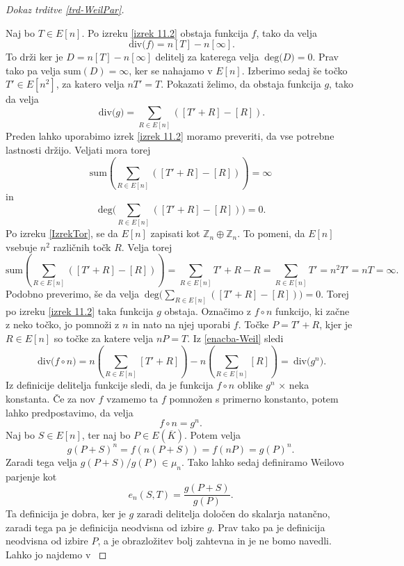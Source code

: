 \documentclass[12pt,a4paper,twoside]{article}
\theoremstyle{definition} %
\theoremstyle{plain} %
\numberwithin{equation}{section}  %
\newcommand{\E}[1]{E({#1})}
\newcommand{\DEG}[1]{\ \text{deg(}{#1}\text{)}}
\newcommand{\Div}[1]{\ \text{div(}{#1}\text{)}}
\begin{document}
\begin{proof}[Dokaz trditve \ref{trd-WeilPar}]~

Naj bo $T \in E[n]$.
Po izreku \ref{izrek 11.2} obstaja funkcija $f$, tako da velja
\begin{equation}
\label{enacba-Weil}
\Div{f} = n[T]-n[\infty].
\end{equation}
To drži ker je $D = n[T]-n[\infty]$ delitelj za katerega velja $\DEG{D} = 0$. Prav tako pa velja $\text{sum}(D) = \infty$, ker se nahajamo v $E[n]$.
Izberimo sedaj še točko $T' \in E[n^2]$, za katero velja $nT' = T$. Pokazati želimo, da obstaja funkcija $g$, tako da velja
$$\Div{g} = \sum_{R \in E[n]}([T' + R]- [R]).$$
Preden lahko uporabimo izrek \ref{izrek 11.2} moramo preveriti, da vse potrebne lastnosti držijo. Veljati mora torej 
$$\text{sum}( \sum_{R \in E[n]}([T' + R]- [R])) = \infty$$
 in
 $$\DEG{ \sum_{R \in E[n]}([T' + R]- [R])} = 0.$$
Po izreku \ref{IzrekTor}, se da $E[n]$ zapisati kot $\mathbb{Z}_n \oplus \mathbb{Z}_n$. To pomeni, da $E[n]$ vsebuje $n^2$ različnih točk $R$. Velja torej
$$\text{sum}(\sum_{R \in E[n]}([T' + R]- [R])) = \sum_{R \in E[n]} T' +R-R = \sum_{R \in E[n]} T' = n^2T' = nT = \infty.$$
Podobno preverimo, še da velja $\DEG{\sum_{R \in E[n]}([T' + R]- [R])} = 0.$ Torej po izreku \ref{izrek 11.2} taka funkcija $g$ obstaja.
Označimo z $f \circ n$ funkcijo, ki začne z neko točko, jo pomnoži z $n$ in nato na njej uporabi $f$. Točke $P = T' + R$, kjer je $R\in E[n]$ so točke za katere velja $nP=T$. Iz \ref{enacba-Weil}
sledi
$$\Div{f \circ n} = n(\sum_{R \in E[n]}[T' + R]) - n(\sum_{R \in E[n]}[R]) = \Div{g^n}.$$
Iz definicije delitelja funkcije sledi, da je funkcija $f \circ n$ oblike $g^n$ $\times$ neka konstanta. Če za nov $f$ vzamemo ta $f$ pomnožen s primerno konstanto, potem lahko predpostavimo, da velja
$$f \circ n = g^n.$$
Naj bo $S \in E[n]$, ter naj bo $P \in \E{\overline{K}}$. Potem velja
$$g(P+S)^n = f(n(P+S)) = f(nP) = g(P)^n.$$
Zaradi tega velja $g(P+S)/g(P) \in \mu_n$.
Tako lahko sedaj definiramo Weilovo parjenje kot
$$e_n(S,T) = \frac{g(P+S)}{g(P)}.$$
Ta definicija je dobra, ker je $g$ zaradi delitelja določen do skalarja natančno, zaradi tega pa je definicija neodvisna od izbire $g$. Prav tako pa je definicija neodvisna od izbire $P$, a je obrazložitev bolj zahtevna in je ne bomo navedli. Lahko jo najdemo v \cite{Silverman2009}


\end{proof}
\end{document}
